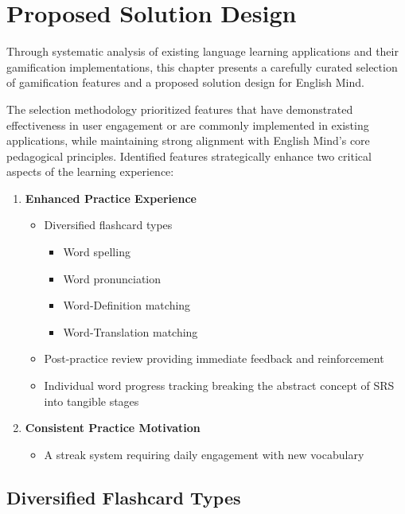 \chapter{Proposed Solution Design}
\label{chap:proposed-solution-design}

Through systematic analysis of existing language learning applications and their gamification implementations, this chapter presents a carefully curated selection of gamification features and a proposed solution design for English Mind. 

The selection methodology prioritized features that have demonstrated effectiveness in user engagement or are commonly implemented in existing applications, while maintaining strong alignment with English Mind's core pedagogical principles. Identified features strategically enhance two critical aspects of the learning experience:

\begin{enumerate}
    \item \textbf{Enhanced Practice Experience} 
    \begin{itemize}
        \item Diversified flashcard types
        \begin{itemize}
            \item Word spelling
            \item Word pronunciation
            \item Word-Definition matching
            \item Word-Translation matching
        \end{itemize}
        \item Post-practice review providing immediate feedback and reinforcement
        \item Individual word progress tracking breaking the abstract concept of SRS into tangible stages
    \end{itemize}
    
    \item \textbf{Consistent Practice Motivation} 
    \begin{itemize}
        \item A streak system requiring daily engagement with new vocabulary
    \end{itemize}
\end{enumerate}

\newpage
\section{Diversified Flashcard Types}

